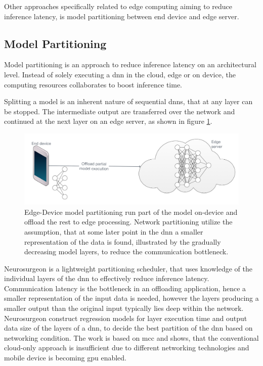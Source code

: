 Other approaches specifically related to edge computing aiming to reduce inference latency, is model partitioning between end device and edge server. 

\subsection{Model Partitioning}

Model partitioning is an approach to reduce inference latency on an architectural level. Instead of solely executing a \gls{dnn} in the cloud, edge or on device, the computing resources collaborates to boost inference time. 

Splitting a model is an inherent nature of sequential \gls{dnn}s, that at any layer can be stopped. The intermediate output are transferred over the network and continued at the next layer on an edge server, as shown in figure \ref{fig:offlaoding}.

\begin{figure}
	\centering
	\includegraphics[width=\linewidth]{figures/models/partitioning}
	\caption[Model partitioning]{Edge-Device model partitioning run part of the model on-device and offload the rest to edge processing. Network partitioning utilize the assumption, that at some later point in the \gls{dnn} a smaller representation of the data is found, illustrated by the gradually decreasing model layers, to reduce the communication bottleneck. }
	\label{fig:offlaoding}
\end{figure}

Neurosurgeon \cite{kang_neurosurgeon:_2017} is a lightweight partitioning scheduler, that uses knowledge of the individual layers of the \gls{dnn} to effectively reduce inference latency. Communication latency is the bottleneck in an offloading application, hence a smaller representation of the input data is needed, however the layers producing a smaller output than the original input typically lies deep within the network. Neurosurgeon construct regression models for layer execution time and  output data size of the layers of a \gls{dnn}, to decide the best partition of the \gls{dnn} based on networking condition. The work is based on \gls{mcc} and shows, that the conventional cloud-only approach is insufficient due to different networking technologies and mobile device is becoming \gls{gpu} enabled. 

